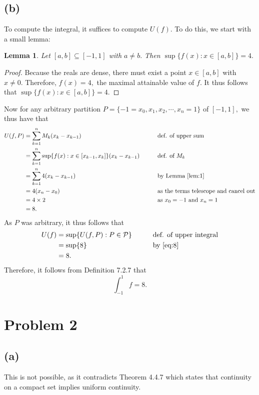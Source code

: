 \documentclass[10pt]{article}
\newtheorem{lemma}[]{Lemma}
\begin{document}
\subsection*{(b)}
To compute the integral, it suffices to compute $U(f).$ To do this, we start with a small lemma:
\begin{lemma}\label{lem:1}
    Let $[a,b]\subseteq [-1,1]$ with $a\neq b.$ Then $\sup\{f(x):x\in[a,b]\}=4.$
\end{lemma}

\begin{proof}
    Because the reals are dense, there must exist a point $x\in[a,b]$ with $x\neq 0.$ Therefore, $f(x)=4,$ the maximal attainable value of $f.$ It thus follows that $\sup\{f(x):x\in[a,b]\}=4.$
\end{proof}

\noindent
Now for any arbitrary partition $P=\{-1=x_0,x_1,x_2,\cdots,x_n=1\}$ of $[-1,1],$ we thus have that
\begin{alignat}{2} \label{eq:8}
    U(f,P) &= \sum_{k=1}^n M_k (x_k-x_{k-1}) &&\text{def. of upper sum} \nonumber\\
    &= \sum_{k=1}^n \sup\{f(x):x\in[x_{k-1},x_k]\}(x_k-x_{k-1}) \qquad&&\text{def. of $M_k$}\nonumber\\
    &= \sum_{k=1}^n 4 (x_k-x_{k-1}) &&\text{by Lemma \ref{lem:1}}\nonumber\\
    &=4 (x_n-x_0) &&\text{as the terms telescope and cancel out}\nonumber\\
    &= 4 \times 2 &&\text{as $x_0=-1$ and $x_n=1$}\nonumber\\
    &= 8.
\end{alignat}
As $P$ was arbitrary, it thus follows that
\begin{alignat*}{2}
    U(f) &= \sup\{U(f,P): P\in\mathcal{P}\} \qquad&&\text{def. of upper integral}\\
    &= \sup\{8\} &&\text{by \eqref{eq:8}} \\
    &= 8.
\end{alignat*}
Therefore, it follows from Definition 7.2.7 that
\[\int_{-1}^{1}f=8.\]

\newpage
\section*{Problem 2}

\subsection*{(a)}
This is not possible, as it contradicts Theorem 4.4.7 which states that continuity on a compact set implies uniform continuity.
\end{document}
